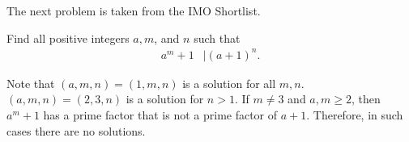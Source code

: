 \documentclass{subfile}
\begin{document}
			The next problem is taken from the IMO Shortlist.
		\begin{problem}
			Find all positive integers $a,m$, and $n$ such that
				\begin{align*}
					a^m+1 & |(a+1)^n.
				\end{align*}
		\end{problem}

		\begin{solution}
			Note that $(a,m,n)=(1,m,n)$ is a solution for all $m,n$. $(a,m,n)=(2,3,n)$ is a solution for $n>1$. If $m\neq3$ and $a,m\geq2$, then $a^m+1$ has a prime factor that is not a prime factor of $a+1$. Therefore, in such cases there are no solutions.
		\end{solution}
\end{document}
